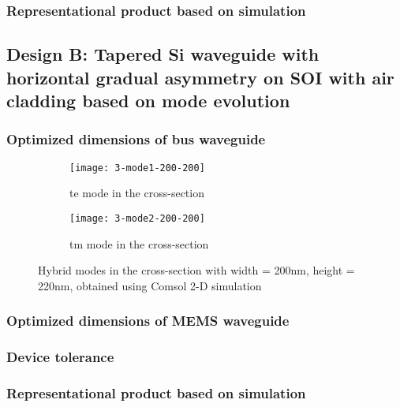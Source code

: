 \documentclass[../report.tex]{subfiles}
\begin{document}
\subsubsection{Representational product based on simulation}			

		\subsection{Design B: Tapered Si waveguide with horizontal gradual asymmetry on SOI with air cladding based on mode evolution}

\subsubsection{Optimized dimensions of bus waveguide}
		
\begin{figure}[H] %
	\begin{subfigure}[t]{0.45\textwidth}
		\texttt{[image: 3-mode1-200-200]}
		\caption{\gls{te} mode in the cross-section}
		\label{fig:3_mode1_200_200}
	\end{subfigure}
	\hfill
	\begin{subfigure}[t]{0.45\textwidth}
		\texttt{[image: 3-mode2-200-200]}
		\caption{\gls{tm} mode in the cross-section}
		\label{fig:3_mode2_200_200}
	\end{subfigure}
	\caption{Hybrid modes in the cross-section with width = 200nm, height = 220nm, obtained using Comsol 2-D simulation}
\end{figure}

\subsubsection{Optimized dimensions of MEMS waveguide}	

\subsubsection{Device tolerance}

\subsubsection{Representational product based on simulation}
\end{document}
